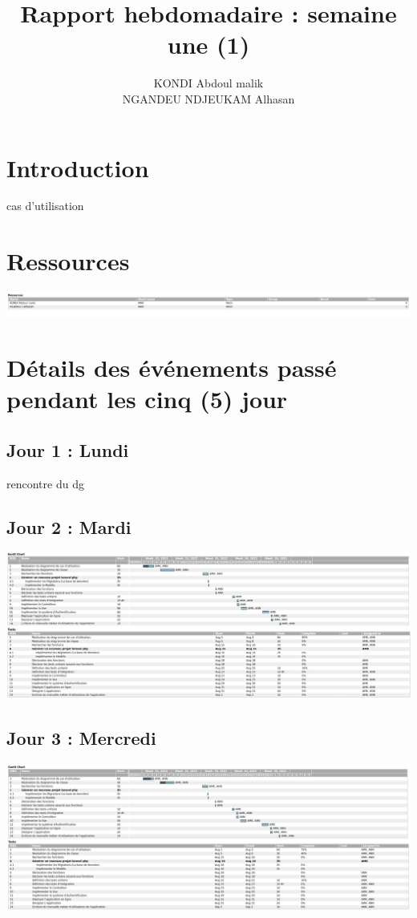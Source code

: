 \documentclass[12pt,a4paper]{article}
\author{KONDI Abdoul malik \\ NGANDEU NDJEUKAM Alhasan}
\title{Rapport hebdomadaire : semaine une (1)}
\begin{document}
\maketitle
\tableofcontents
\newpage

\section{Introduction}
	cas d'utilisation
\section{Ressources}
\includegraphics[scale=0.25]{images/resources.png}
\section{Détails des événements passé pendant les cinq (5) jour}
\subsection{Jour 1 : Lundi}
rencontre du dg 
\subsection{Jour 2 : Mardi}
\includegraphics[scale=0.23]{images/jour2.png}
\subsection{Jour 3 : Mercredi}
\includegraphics[scale=0.23]{images/jour3.png}
\end{document}

